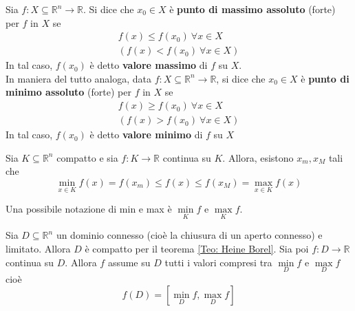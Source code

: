 \begin{definition}
Sia $f:X \subseteq \mathbb{R}^n \to \mathbb{R}$. Si dice che $x_0 \in X$ è \textbf{punto di massimo assoluto} (forte) per $f$ in $X$ se
\begin{equation*}
    \begin{aligned}
        f(x) \leq f(x_0) \ \forall x  \in X \\
        (f(x) < f(x_0) \ \forall x  \in X)
    \end{aligned}
\end{equation*}
In tal caso, $f(x_0)$ è detto \textbf{valore massimo} di $f$ su $X$.\\
In maniera del tutto analoga, data $f:X \subseteq \mathbb{R}^n \to \mathbb{R}$, si dice che $x_0 \in X$ è \textbf{punto di minimo assoluto} (forte) per $f$ in $X$ se
\begin{equation*}
    \begin{aligned}
        f(x) \geq f(x_0) \ \forall x \in X\\
        (f(x)>f(x_0) \ \forall x \in X)
    \end{aligned}
\end{equation*}
In tal caso, $f(x_0)$ è detto \textbf{valore minimo} di $f$ su $X$
\end{definition}
\begin{theorem}[Weierstrass] \label{Teo: Weierstrass}
    Sia $K \subseteq \mathbb{R}^n$ compatto e sia $f: K \to \mathbb{R}$ continua su $K$. Allora, esistono $x_m, x_M$ tali che
    \begin{equation*}
    \min_{x \in K}{f(x)}= f(x_m) \leq f(x) \leq f(x_M) = \max_{x \in K}{f(x)}    
    \end{equation*}
\end{theorem}
    \begin{oss}
        Una possibile notazione di min e max è $ \min\limits_{K}{f}$ e $\max\limits_{K}{f}$.
    \end{oss}
\begin{theorem} \label{Teo: Valori intermedi}
    Sia $D \subseteq \mathbb{R}^n$ un dominio connesso (cioè la chiusura di un aperto connesso) e limitato. Allora $D$ è compatto per il teorema \ref{Teo: Heine Borel}.
    Sia poi $f:D \to \mathbb{R}$ continua su $D$. Allora $f$ assume su $D$ tutti i valori compresi tra $\min\limits_{D}{f}$ e $\max\limits_{D}{f}$ cioè
    \begin{equation*}
        f(D)=\left[ \min_{D}{f}, \max_{D}{f}\right]
    \end{equation*}
\end{theorem}

